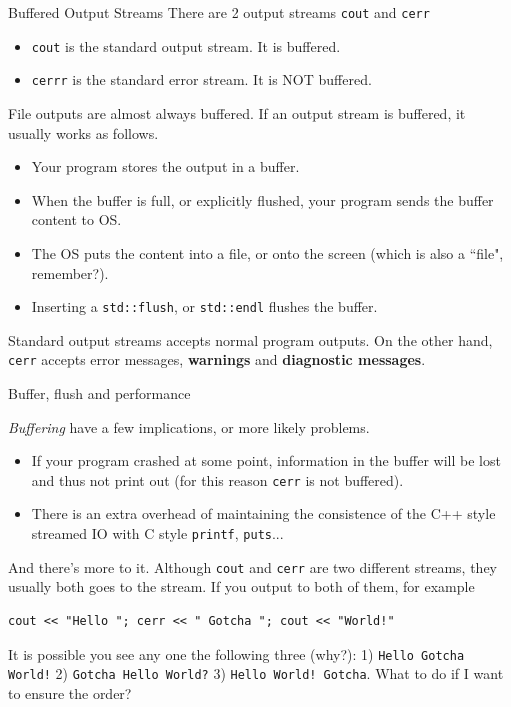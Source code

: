 \begin{frame}[fragile]{Buffered Output Streams}
There are 2 output streams \texttt{cout} and \texttt{cerr}

\begin{itemize}
\item \texttt{cout} is the standard output stream. It is buffered. 
\item \texttt{cerrr} is the standard error stream. It is NOT buffered. 
\end{itemize}

File outputs are almost always buffered. If an output stream is buffered, it usually works as follows.

\begin{itemize}
\item Your program stores the output in a buffer.
\item When the buffer is full, or explicitly flushed, your program sends the buffer content to OS.
\item The OS puts the content into a file, or onto the screen (which is also a ``file", remember?).
\item Inserting a \texttt{std::flush}, or \texttt{std::endl} flushes the buffer.
\end{itemize}

Standard output streams accepts normal program outputs. On the other hand, \texttt{cerr} accepts error messages, \textbf{warnings} and \textbf{diagnostic messages}. 
\end{frame}

\begin{frame}[fragile]{Buffer, flush and performance}

\textit{Buffering} have a few implications, or more likely problems. 

\begin{itemize}
\item If your program crashed at some point, information in the buffer will be lost and thus not print out (for this reason \texttt{cerr} is not buffered).
\item There is an extra overhead of maintaining the consistence of the C++ style streamed IO with C style \texttt{printf}, \texttt{puts}... 
\end{itemize}

And there's more to it. Although \texttt{cout} and \texttt{cerr} are two different streams, they usually both goes to the stream.  If you output to both of them, for example

\begin{verbatim}
cout << "Hello "; cerr << " Gotcha "; cout << "World!"
\end{verbatim}

It is possible you see any one the following three (why?): 1) \texttt{Hello Gotcha World!} 2) \texttt{Gotcha Hello World?} 3) \texttt{Hello World! Gotcha}. What to do if I want to ensure the order?
\end{frame}


